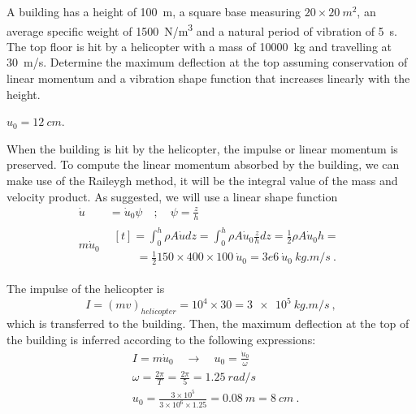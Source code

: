 
\begin{Exercise}[label={helicopter_impulse}]
A building has a height of \SI{100}{m}, a square base measuring $20\times\SI{20}{m^2}$, an average specific weight of \SI{1500}{N/m^3} and a natural period of vibration of \SI{5}{s}. The top floor is hit by a helicopter with a mass of \SI{10000}{kg} and travelling at \SI{30}{m/s}. Determine the maximum deflection at the top assuming conservation of linear momentum and a vibration shape function that increases linearly with the height.

\begin{center}
\end{center}

\shortAnswer $u_0 = \SI{12}{cm}$.
\end{Exercise}



\begin{Answer}[ref={helicopter_impulse}]
When the building is hit by the helicopter, the impulse or linear momentum is preserved. To compute the linear momentum absorbed by the building, we can make use of the Raileygh method, it will be the integral value of the mass and velocity product. As suggested, we will use a linear shape function
\begin{align*}
\dot{u}& = \dot{u}_0\psi \quad ; \quad \psi = \frac{z}{h} \\
m\dot{u}_0& \begin{multlined}[t] = \int_0^h \rho A\dot{u}dz = \int_0^h \rho A\dot{u}_0\frac{z}{h}dz = \frac{1}{2}\rho A\dot{u}_0h = \\
    \qquad= \frac{1}{2}150\times400\times100\ \dot{u}_0
        = 3e6\ \dot{u}_0\ \si{kg.m/s}\ .\end{multlined}
\end{align*}

The impulse of the helicopter is
$$
I = (mv)_{helicopter} = 10^4 \times 30 = \SI{3e5}{kg.m/s}\ ,
$$
which is transferred to the building. Then, the maximum deflection at the top of the building is inferred according to the following expressions:
\begin{align*}
&I = m\dot{u}_0 \quad \rightarrow \quad u_0 = \frac{\dot{u}_0}{\omega} \\
&\omega = \frac{2\pi}{T} = \frac{2\pi}{5} = \SI{1.25}{rad/s} \\
&u_0 = \frac{3\times 10^5}{3\times 10^6\times 1.25} = \SI{0.08}{m} = \SI{8}{cm}\ .
\end{align*}

\end{Answer}
